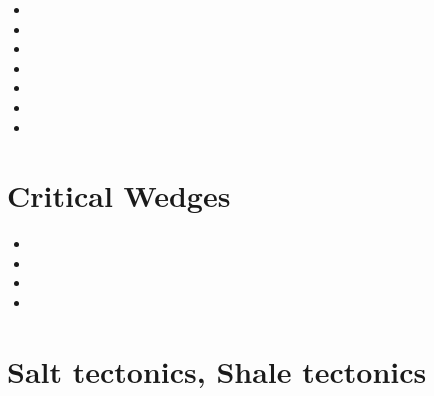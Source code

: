 \begin{small}
\begin{itemize}
\item[\nineteenninetyfive] 
\item[\nineteenninetyeight] 
\item[\twothousandsix] 
\item[\twothousandeight] 
\item[\twothousandten] 
\item[\twothousandsixteen] 
\item[\twothousandtwentythree] 
\end{itemize}
\end{small}




\section{Critical Wedges}

\begin{small}
\begin{itemize}
\item[\nineteenninetyfour] 
\item[\twothousandsix] 
\item[\twothousandeight] 
\item[\twothousandthirteen] 
\end{itemize}
\end{small}

\section{Salt tectonics, Shale tectonics}

